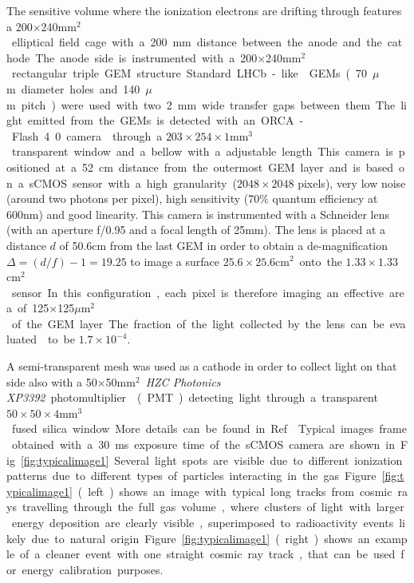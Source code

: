 \documentclass[12pt]{iopart}
\begin{document}
The sensitive volume where the ionization electrons are drifting
through features a 200$\times$240\unit{mm$^2$} elliptical field cage
with a 200 mm distance between the anode and the cathode. The anode
side is instrumented with a 200$\times$240\unit{mm$^2$} rectangular
triple GEM structure.  Standard LHCb-like \cite{bib:thesis} GEMs
(70\unit{$\mu$m} diameter holes and 140\unit{$\mu$m} pitch) were used
with two 2\unit{mm} wide transfer gaps between them. The light emitted
from the GEMs is detected with an ORCA-Flash 4.0 camera
\cite{ORCAcamera} through a $203\times254\times1$\unit{mm$^3$}
transparent window and a bellow with a adjustable length.  This camera
is positioned at a 52 cm distance from the outermost GEM layer and is
based on a sCMOS sensor with a high granularity ($2048\times2048$
pixels), very low noise (around two photons per pixel), high
sensitivity (70\% quantum efficiency at 600\unit{nm}) and good
linearity. This camera is instrumented with a Schneider lens (with an
aperture f/0.95 and a focal length of 25\unit{mm}). The lens is placed
at a distance $d$ of 50.6\unit{cm} from the last GEM in order to
obtain a de-magnification $\Delta = (d/f) - 1 = 19.25$ to image a
surface $25.6 \times 25.6$\unit{cm$^2$} onto the $1.33 \times
1.33$\unit{cm$^2$} sensor.  In this configuration, each pixel is
therefore imaging an effective area of 125$\times$125\unit{$\mu$m$^2$}
of the GEM layer. The fraction of the light collected by the lens can
be evaluated \cite{bib:jinst_orange1} to be $1.7 \times 10^{-4}$.

A semi-transparent mesh was used as a cathode in order to collect
light on that side also with a 50$\times$50\unit{mm$^2$} \textit{HZC
  Photonics XP3392} photomultiplier \cite{PMTPhotonics} (PMT)
detecting light through a transparent $50\times50\times4$\unit{mm$^3$}
fused silica window. More details can be found in Ref.~\cite{paperBTF}.




Typical images frame obtained with a 30\unit{ms} exposure time of the
sCMOS camera are shown in Fig.~\ref{fig:typicalimage1}. Several light
spots are visible due to different ionization patterns due to
different types of particles interacting in the gas.
Figure~\ref{fig:typicalimage1} (left) shows an image with typical long
tracks from cosmic rays travelling through the full gas volume, where
clusters of light with larger energy deposition are clearly visible,
superimposed to radioactivity events likely due to natural origin.
Figure~\ref{fig:typicalimage1} (right) shows an example of a cleaner
event with one straight cosmic ray track, that can be used for energy
calibration purposes.
\end{document}

